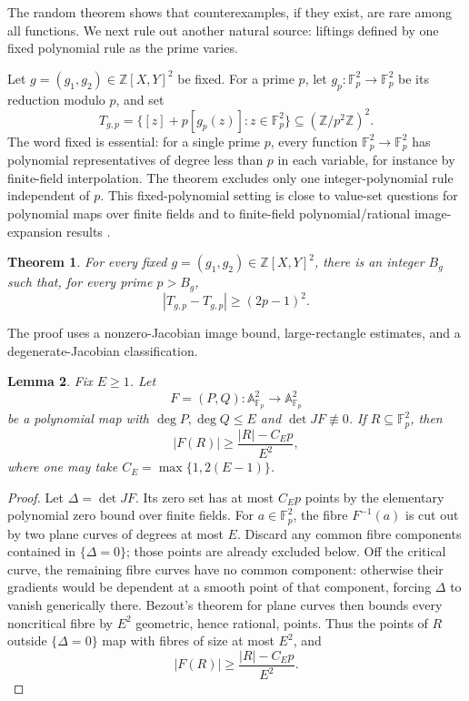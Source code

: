\documentclass[reqno]{amsart}
\numberwithin{equation}{section}
\newtheorem{theorem}{Theorem}[section]
\newtheorem{lemma}[theorem]{Lemma}
\theoremstyle{definition}
\begin{document}
The random theorem shows that counterexamples, if they exist, are rare among all
functions.  We next rule out another natural source: liftings defined by one
fixed polynomial rule as the prime varies.

Let $g=(g_1,g_2)\in\mathbb Z[X,Y]^2$ be fixed.  For a prime $p$, let
$g_p:\mathbb F_p^2\to\mathbb F_p^2$ be its reduction modulo $p$, and set
\[
  T_{g,p}=\{[z]+p[g_p(z)]:z\in\mathbb F_p^2\}
  \subseteq (\mathbb Z/p^2\mathbb Z)^2.
\]
The word fixed is essential: for a single prime \(p\), every function
\(\mathbb F_p^2\to\mathbb F_p^2\) has polynomial representatives of degree less
than \(p\) in each variable, for instance by finite-field interpolation.  The theorem excludes only one
integer-polynomial rule independent of \(p\). This fixed-polynomial setting is close to value-set questions for
polynomial maps over finite fields \cite{MullenWanWang2013} and to finite-field polynomial/rational
image-expansion results
\cite{BukhTsimerman2012}.

\begin{theorem}
\label{thm:fixed-polynomial-square-plane}
For every fixed $g=(g_1,g_2)\in\mathbb Z[X,Y]^2$, there is an integer $B_g$
such that, for every prime $p>B_g$,
\[
  |T_{g,p}-T_{g,p}|\geq (2p-1)^2.
\]
\end{theorem}

The proof uses a nonzero-Jacobian image bound, large-rectangle estimates, and a
degenerate-Jacobian classification.
\begin{lemma}
\label{lem:image-bound-nonzero-jacobian}
Fix $E\geq 1$.  Let
\[
  F=(P,Q):\mathbb A^2_{\mathbb F_p}\to\mathbb A^2_{\mathbb F_p}
\]
be a polynomial map with $\deg P,\deg Q\leq E$ and $\det JF\not\equiv 0$.  If
$R\subseteq\mathbb F_p^2$, then
\[
  |F(R)|\geq \frac{|R|-C_Ep}{E^2},
\]
where one may take $C_E=\max\{1,2(E-1)\}$.
\end{lemma}

\begin{proof}
Let $\Delta=\det JF$.  Its zero set has at most $C_Ep$ points by the elementary
polynomial zero bound over finite fields.
For $a\in\mathbb F_p^2$, the fibre $F^{-1}(a)$ is cut out by two plane curves of
degrees at most $E$.  Discard any common fibre components contained in
\(\{\Delta=0\}\); those points are already excluded below.  Off the critical
curve, the remaining fibre curves have no common component: otherwise their
gradients would be dependent at a smooth point of that component, forcing
$\Delta$ to vanish generically there.  Bezout's theorem for plane curves
\cite{CoxLittleOShea2025IVA} then bounds every noncritical fibre by $E^2$
geometric, hence rational, points.
Thus the points of $R$ outside $\{\Delta=0\}$ map with fibres of size at most
$E^2$, and
\[
  |F(R)|\geq \frac{|R|-C_Ep}{E^2}.
\]
\end{proof}
\end{document}
